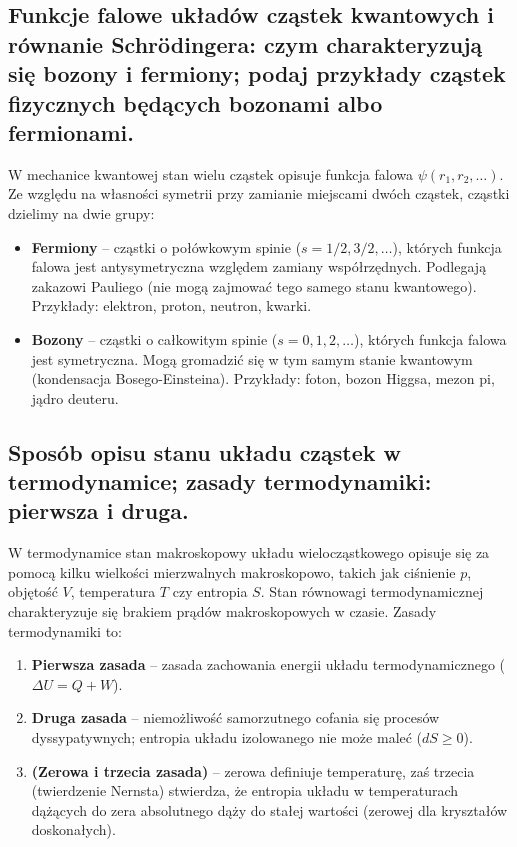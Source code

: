 \documentclass[11pt,a4paper]{article}
\begin{document}
\subsection{Funkcje falowe układów cząstek kwantowych i równanie Schrödingera: czym charakteryzują się bozony i fermiony; podaj przykłady cząstek fizycznych będących bozonami albo fermionami.}
W mechanice kwantowej stan wielu cząstek opisuje funkcja falowa $\psi(r_1, r_2, \dots)$. Ze względu na własności symetrii przy zamianie miejscami dwóch cząstek, cząstki dzielimy na dwie grupy:
\begin{itemize}
    \item \textbf{Fermiony} -- cząstki o połówkowym spinie ($s = 1/2, 3/2, \dots$), których funkcja falowa jest antysymetryczna względem zamiany współrzędnych. Podlegają zakazowi Pauliego (nie mogą zajmować tego samego stanu kwantowego). Przykłady: elektron, proton, neutron, kwarki.
    \item \textbf{Bozony} -- cząstki o całkowitym spinie ($s = 0, 1, 2, \dots$), których funkcja falowa jest symetryczna. Mogą gromadzić się w tym samym stanie kwantowym (kondensacja Bosego-Einsteina). Przykłady: foton, bozon Higgsa, mezon pi, jądro deuteru.
\end{itemize}

\subsection{Sposób opisu stanu układu cząstek w termodynamice; zasady termodynamiki: pierwsza i druga.}
W termodynamice stan makroskopowy układu wielocząstkowego opisuje się za pomocą kilku wielkości mierzwalnych makroskopowo, takich jak ciśnienie $p$, objętość $V$, temperatura $T$ czy entropia $S$. Stan równowagi termodynamicznej charakteryzuje się brakiem prądów makroskopowych w czasie. Zasady termodynamiki to:
\begin{enumerate}
    \item \textbf{Pierwsza zasada} -- zasada zachowania energii układu termodynamicznego ($\Delta U = Q + W$).
    \item \textbf{Druga zasada} -- niemożliwość samorzutnego cofania się procesów dyssypatywnych; entropia układu izolowanego nie może maleć ($dS \ge 0$).
    \item \textbf{(Zerowa i trzecia zasada)} -- zerowa definiuje temperaturę, zaś trzecia (twierdzenie Nernsta) stwierdza, że entropia układu w temperaturach dążących do zera absolutnego dąży do stałej wartości (zerowej dla kryształów doskonałych).
\end{enumerate}
\end{document}
